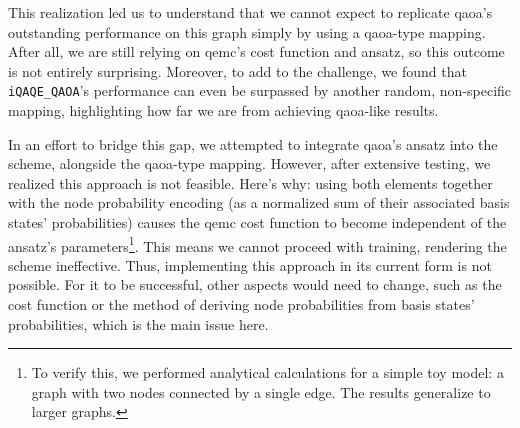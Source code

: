 \vspace{-4.0mm}
This realization led us to understand that we cannot expect to replicate \acrshort{qaoa}'s outstanding performance on this graph simply by using a \acrshort{qaoa}-type mapping. After all, we are still relying on \acrshort{qemc}'s cost function and ansatz, so this outcome is not entirely surprising. Moreover, to add to the challenge, we found that \texttt{iQAQE\_QAOA}'s performance can even be surpassed by another random, non-specific mapping, highlighting how far we are from achieving \acrshort{qaoa}-like results.

In an effort to bridge this gap, we attempted to integrate \acrshort{qaoa}'s ansatz into the scheme, alongside the \acrshort{qaoa}-type mapping. However, after extensive testing, we realized this approach is not feasible. Here's why: using both elements together with the node probability encoding (as a normalized sum of their associated basis states' probabilities) causes the \acrshort{qemc} cost function to become independent of the ansatz's parameters\footnote{To verify this, we performed analytical calculations for a simple toy model: a graph with two nodes connected by a single edge. The results generalize to larger graphs.}. This means we cannot proceed with training, rendering the scheme ineffective. Thus, implementing this approach in its current form is not possible. For it to be successful, other aspects would need to change, such as the cost function or the method of deriving node probabilities from basis states' probabilities, which is the main issue here.
















\vspace{-5mm}
